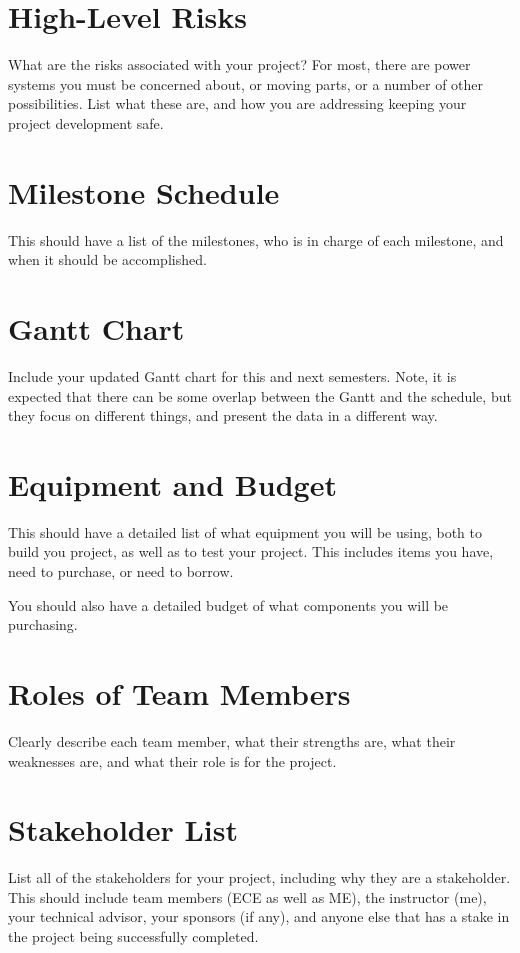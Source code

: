 \documentclass[12pt,onecolumn]{IEEEtran}			%
\begin{document}
\section{High-Level Risks}
What are the risks associated with your project?  For most, there are power systems you must be concerned about,
or moving parts, or a number of other possibilities.  List what these are, and how you are addressing keeping
your project development safe.

\section{Milestone Schedule}
This should have a list of the milestones, who is in charge of each milestone, and when it should be accomplished.

\section{Gantt Chart}
Include your updated Gantt chart for this and next semesters.  Note, it is expected that there can be some
overlap between the Gantt and the schedule, but they focus on different things, and present the data
in a different way.

\section{Equipment and Budget}
This should have a detailed list of what equipment you will be using, both to build you project, as well as to
test your project.  This includes items you have, need to purchase, or need to borrow.

You should also have a detailed budget of what components you will be purchasing.

\section{Roles of Team Members}
 Clearly describe each team member, what their strengths are, what their weaknesses are, and what their role is
 for the project.
 
 \section{Stakeholder List}
 List all of the stakeholders for your project, including why they are a stakeholder.
 This should include team members (ECE as well as ME), the instructor (me), your technical advisor, your sponsors (if any),
 and anyone else that has a stake in the project being successfully completed.
 
\end{document}
